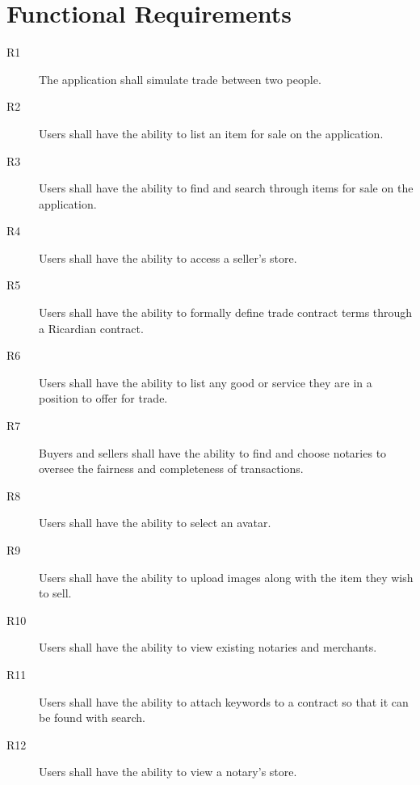 \documentclass{article}
\begin{document}
\section*{Functional Requirements}
\begin{description}
\item[R1]
The application shall simulate trade between two people.
\item[R2]
Users shall have the ability to list an item for sale on the application.
\item[R3]
Users shall have the ability to find and search through items for sale on the application.
\item[R4]
Users shall have the ability to access a seller's store.
\item[R5]
Users shall have the ability to formally define trade contract terms through a Ricardian contract.
\item[R6]
Users shall have the ability to list any good or service they are in a position to offer for trade.
\item[R7]
Buyers and sellers shall have the ability to find and choose notaries to oversee the fairness and completeness of transactions.
\item[R8]
Users shall have the ability to select an avatar.
\item[R9]
Users shall have the ability to upload images along with the item they wish to sell.
\item[R10]
Users shall have the ability to view existing notaries and merchants.
\item[R11]
Users shall have the ability to attach keywords to a contract so that it can be found with search.
\item[R12]
Users shall have the ability to view a notary's store.
\end{description}
\end{document}
